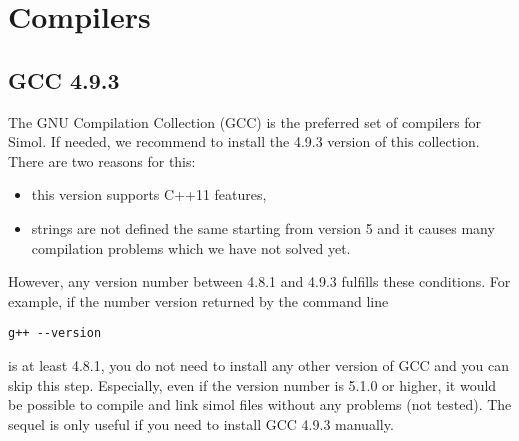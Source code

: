 \section{Compilers}

\subsection{GCC 4.9.3}

The GNU Compilation Collection (GCC) is the preferred set of compilers for Simol. If needed, we recommend to install the 4.9.3 version of this collection. There are two reasons for this:
\begin{itemize}
\item this version supports C++11 features,
\item strings are not defined the same starting from version 5 and it causes many compilation problems which we have not solved yet.
\end{itemize}
However, any version number between 4.8.1 and 4.9.3 fulfills these conditions. For example, if the number version returned by the command line
\begin{verbatim}
g++ --version
\end{verbatim}
is at least 4.8.1, you do not need to install any other version of GCC and you can skip this step. Especially, even if the version number is 5.1.0 or higher, it would be possible to compile and link simol files without any problems (not tested). The sequel is only useful if you need to install GCC 4.9.3 manually. 

